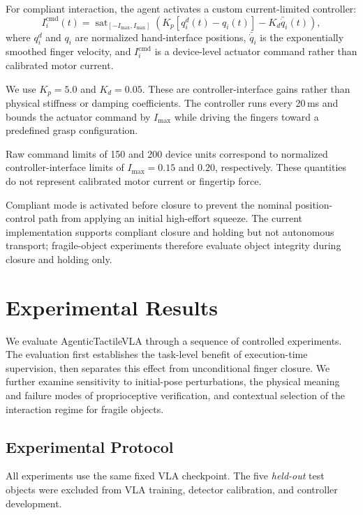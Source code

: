 \documentclass[letterpaper,10pt,conference]{ieeeconf}
\begin{document}
For compliant interaction, the agent activates a custom current-limited
controller:
\begin{equation}
I_i^{\mathrm{cmd}}(t)=
\operatorname{sat}_{[-I_{\max},I_{\max}]}
\left(
K_p[q_i^d(t)-q_i(t)]
-
K_d\bar{\dot q}_i(t)
\right),
\end{equation}
where $q_i^d$ and $q_i$ are normalized hand-interface positions,
$\bar{\dot q}_i$ is the exponentially smoothed finger velocity, and
$I_i^{\mathrm{cmd}}$ is a device-level actuator command rather than calibrated
motor current.

We use $K_p=5.0$ and $K_d=0.05$. These are controller-interface gains rather
than physical stiffness or damping coefficients. The controller runs every
20\,ms and bounds the actuator command by $I_{\max}$ while driving the fingers
toward a predefined grasp configuration.

Raw command limits of 150 and 200 device units correspond to normalized
controller-interface limits of $I_{\max}=0.15$ and $0.20$, respectively.
These quantities do not represent calibrated motor current or fingertip force.

Compliant mode is activated before closure to prevent the nominal
position-control path from applying an initial high-effort squeeze. The current
implementation supports compliant closure and holding but not autonomous
transport; fragile-object experiments therefore evaluate object integrity
during closure and holding only.

\section{Experimental Results}
\label{sec:results}

We evaluate AgenticTactileVLA through a sequence of controlled experiments.
The evaluation first establishes the task-level benefit of execution-time
supervision, then separates this effect from unconditional finger closure.
We further examine sensitivity to initial-pose perturbations, the physical
meaning and failure modes of proprioceptive verification, and contextual
selection of the interaction regime for fragile objects.

\subsection{Experimental Protocol}
\label{sec:protocol}

All experiments use the same fixed VLA checkpoint. The five \emph{held-out}
test objects were excluded from VLA training, detector calibration, and
controller development.
\end{document}
